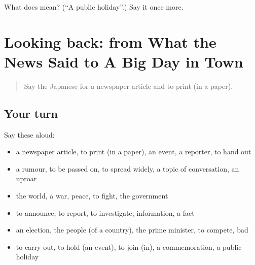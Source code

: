 \begin{tcolorbox}[breakable,colback=teal!4,colframe=teal!35!black,title={Before you move on}]
What does  mean? (\textquotedblleft{}A public holiday\textquotedblright{}.) Say it once more.
\end{tcolorbox}
\section[(dialogue)]{Looking back: from What the News Said to A Big Day in Town}

\label{lesson:JA-R285-review-280-285}



\begin{quote}
Say the Japanese for a newspaper article and to print (in a paper).
\end{quote}

\subsection*{Your turn}
Say these aloud:

\begin{itemize}
\raggedright
  \item a newspaper article, to print (in a paper), an event, a reporter, to hand out
  \item a rumour, to be passed on, to spread widely, a topic of conversation, an uproar
  \item the world, a war, peace, to fight, the government
  \item to announce, to report, to investigate, information, a fact
  \item an election, the people (of a country), the prime minister, to compete, bad
  \item to carry out, to hold (an event), to join (in), a commemoration, a public holiday
\end{itemize}

